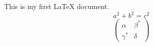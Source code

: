 \documentclass{article}
\begin{document}
This is my first LaTeX document. 
\begin{equation}
  a^2 + b^2 = c^2 
\end{equation}
\[
\begin{pmatrix}
\alpha& \beta^{*}\\
\gamma^{*}& \delta
\end{pmatrix}
\]
\end{document}
